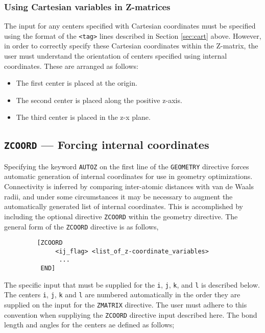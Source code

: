 \subsubsection{Using Cartesian variables in Z-matrices}
\label{sec:zmcart}

The input for any centers specified with Cartesian coordinates must
be specified using the format of the \verb+<tag>+ lines described
in Section \ref{sec:cart} above.  However, in
order to correctly specify these Cartesian coordinates 
within the Z-matrix, the user must
understand the orientation of centers specified using
internal coordinates.  These are arranged as follows:
\begin{itemize}
\item The first center is placed at the origin.
\item The second center is placed along the positive z-axis.
\item The third center is placed in the z-x plane.
\end{itemize}

\subsection{{\tt ZCOORD} --- Forcing internal coordinates}
\label{sec:zcoord}

Specifying the keyword \verb+AUTOZ+ on the first line of the \verb+GEOMETRY+
directive forces automatic generation of internal
coordinates for use in geometry optimizations.  Connectivity
is inferred by comparing inter-atomic distances with van de Waals
radii, and under some circumstances it may be necessary to augment the
automatically generated list of internal coordinates.  This is
accomplished by including the optional directive {\tt ZCOORD} within the geometry
directive.  The general form of the \verb+ZCOORD+ directive is as follows,
\begin{verbatim}
         [ZCOORD
              <ij_flag> <list_of_z-coordinate_variables>
               ...
          END]
\end{verbatim}

The specific input that must be supplied for the \verb+i+, \verb+j+, \verb+k+, and
\verb+l+ is described below.  The centers 
\verb+i+, \verb+j+, \verb+k+ and \verb+l+ are numbered automatically in the
order they are supplied on the input for the \verb+ZMATRIX+ directive.  The
user must adhere to this convention when suppliying the \verb+ZCOORD+
directive input described here.  The bond length and angles for the centers
ae defined as follows;

